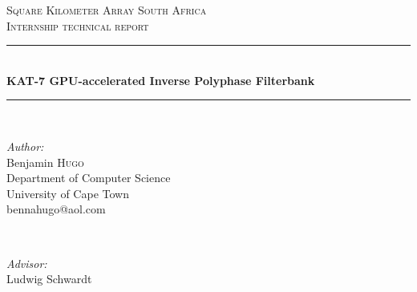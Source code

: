 \documentclass[a4paper,10pt]{article}
\begin{document}
\begin{titlepage}

\newcommand{\HRule}{\rule{\linewidth}{0.5mm}} %

\center %
 

\textsc{\LARGE Square Kilometer Array South Africa}\\[1.5cm]
\textsc{\Large Internship technical report}\\[0.5cm]


\HRule \\[0.4cm]
{ \huge \bfseries KAT-7 GPU-accelerated Inverse Polyphase Filterbank}\\[0.4cm]
\HRule \\[1.5cm]
 

\begin{minipage}{0.4\textwidth}
\begin{flushleft} \large
\emph{Author:}\\
Benjamin \textsc{Hugo}\\[0.2cm] %
\small{Department of Computer Science}\\
\small{University of Cape Town}\\
\small{bennahugo@aol.com}

\end{flushleft}
\end{minipage}
~
\begin{minipage}{0.4\textwidth}
\begin{flushright} \large
\emph{Advisor:} \\
Ludwig Schwardt
\end{flushright}
\end{minipage}\\[4cm]



\end{titlepage}
\end{document}
